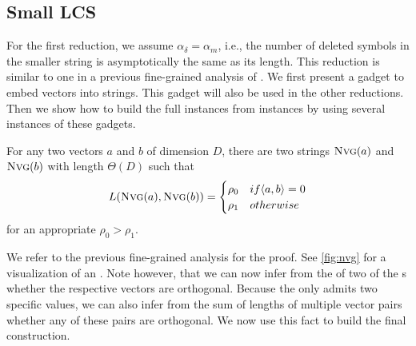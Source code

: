 \subsection{Small LCS}
For the first reduction, we assume $\alpha_\delta = \alpha_m$, i.e., the number of deleted symbols in the smaller string is asymptotically the same as its length.
This reduction is similar to one in a previous fine-grained analysis of \lcs{} \cite{Bringmann.2015}.
We first present a gadget to embed vectors into strings.
This gadget will also be used in the other reductions.
Then we show how to build the full \lcs{} instances from \ov{} instances by using several instances of these gadgets.



\begin{theorem}
\label{thm:nvg}
For any two vectors $a$ and $b$ of dimension $D$, there are two strings $\text{\textsc{Nvg}}(a)$ and $\text{\textsc{Nvg}}(b)$ with length $\Theta(D)$ such that
\[
L(\text{\textsc{Nvg}}(a), \text{\textsc{Nvg}}(b)) = \begin{cases}
		\rho_0 & if \langle a, b \rangle = 0\\
		\rho_1 & otherwise
	\end{cases}
\]
for an appropriate $\rho_0 > \rho_1$.
\end{theorem}



We refer to the previous fine-grained analysis \cite{Bringmann.2015} for the proof.
See \autoref{fig:nvg} for a visualization of an \nvgName{}.
Note however, that we can now infer from the \lcs{} of two of the \nvgName{}s whether the respective vectors are orthogonal.
Because the \lcs{} only admits two specific values, we can also infer from the sum of \lcs{} lengths of multiple vector pairs whether any of these pairs are orthogonal.
We now use this fact to build the final construction.


